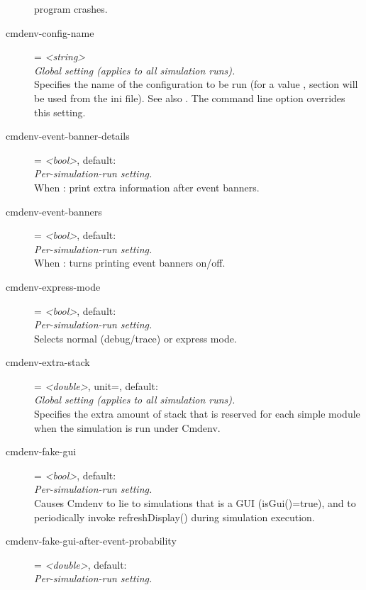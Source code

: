 \begin{description}
    program crashes.
\item[cmdenv-config-name] = \textit{<string>}\\
    \textit{Global setting (applies to all simulation runs).}\\
    Specifies the name of the configuration to be run (for a value ,
    section  will be used from the ini file).
    See also
    . The
     command line option overrides this setting.
\item[cmdenv-event-banner-details] = \textit{<bool>}, default: \\
    \textit{Per-simulation-run setting.}\\
    When
    :
    print extra information after event banners.
\item[cmdenv-event-banners] = \textit{<bool>}, default: \\
    \textit{Per-simulation-run setting.}\\
    When
    :
    turns printing event banners on/off.
\item[cmdenv-express-mode] = \textit{<bool>}, default: \\
    \textit{Per-simulation-run setting.}\\
    Selects normal (debug/trace) or express mode.
\item[cmdenv-extra-stack] = \textit{<double>}, unit=, default: \\
    \textit{Global setting (applies to all simulation runs).}\\
    Specifies the extra amount of stack that is reserved for each
     simple module when the simulation is run under Cmdenv.
\item[cmdenv-fake-gui] = \textit{<bool>}, default: \\
    \textit{Per-simulation-run setting.}\\
    Causes Cmdenv to lie to simulations that is a GUI (isGui()=true), and to
    periodically invoke refreshDisplay() during simulation execution.
\item[cmdenv-fake-gui-after-event-probability] = \textit{<double>}, default: \\
    \textit{Per-simulation-run setting.}\\

\end{description}
